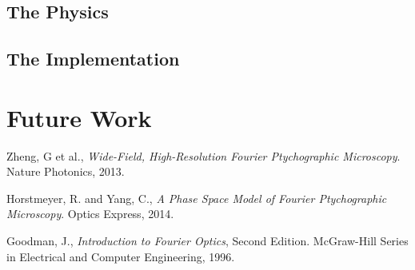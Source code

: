 \documentclass[11pt,a4paper,journal]{IEEEtran}
\begin{document}
\subsection{The Physics}
\subsection{The Implementation}

\section{Future Work}

\begin{thebibliography}{10}

  Zheng, G et al.,
  \emph{Wide-Field, High-Resolution Fourier Ptychographic Microscopy}.
  Nature Photonics,
  2013.
  
  Horstmeyer, R. and Yang, C.,
  \emph{A Phase Space Model of Fourier Ptychographic Microscopy}.
  Optics Express,
  2014.
  
  Goodman, J.,
  \emph{Introduction to Fourier Optics}, Second Edition.
  McGraw-Hill Series in Electrical and Computer Engineering,
  1996.
  
\end{thebibliography}
\end{document}
